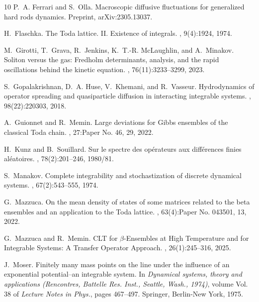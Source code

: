 \documentclass{amsart}
\numberwithin{equation}{section}
\theoremstyle{remark}
\theoremstyle{definition}
\begin{document}
\begin{thebibliography}{10}
		P.~A. Ferrari and S.~Olla.
		\newblock Macroscopic diffusive fluctuations for generalized hard rods
		dynamics.
		\newblock Preprint, ar{X}iv:2305.13037.
		
		H.~Flaschka.
		\newblock The {T}oda lattice. {II}. {E}xistence of integrals.
		, 9(4):1924, 1974.
		
		M.~Girotti, T.~Grava, R.~Jenkins, K.~T.-R. McLaughlin, and A.~Minakov.
		\newblock Soliton versus the gas: {F}redholm determinants, analysis, and the
		rapid oscillations behind the kinetic equation.
		, 76(11):3233--3299, 2023.
		
		S.~Gopalakrishnan, D.~A. Huse, V.~Khemani, and R.~Vasseur.
		\newblock Hydrodynamics of operator spreading and quasiparticle diffusion in
		interacting integrable systems.
		, 98(22):220303, 2018.
		
		A.~Guionnet and R.~Memin.
		\newblock Large deviations for {G}ibbs ensembles of the classical {T}oda chain.
		, 27:Paper No. 46, 29, 2022.
		
		H.~Kunz and B.~Souillard.
		\newblock Sur le spectre des op\'erateurs aux diff\'erences finies
		al\'eatoires.
		, 78(2):201--246, 1980/81.
		
		S.~Manakov.
		\newblock Complete integrability and stochastization of discrete dynamical
		systems.
		, 67(2):543--555, 1974.
		
		G.~Mazzuca.
		\newblock On the mean density of states of some matrices related to the beta
		ensembles and an application to the {T}oda lattice.
		, 63(4):Paper No. 043501, 13, 2022.
		
		G.~Mazzuca and R.~Memin.
		\newblock C{LT} for {$\beta$}-{E}nsembles at {H}igh {T}emperature and for
		{I}ntegrable {S}ystems: {A} {T}ransfer {O}perator {A}pproach.
		, 26(1):245--316, 2025.
		
		J.~Moser.
		\newblock Finitely many mass points on the line under the influence of an
		exponential potential--an integrable system.
		\newblock In {\em Dynamical systems, theory and applications ({R}encontres,
			{B}attelle {R}es. {I}nst., {S}eattle, {W}ash., 1974)}, volume Vol. 38 of {\em
			Lecture Notes in Phys.}, pages 467--497. Springer, Berlin-New York, 1975.
		

\end{thebibliography}
\end{document}
